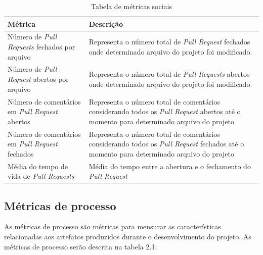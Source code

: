 \begin{table}[]
\centering
\caption{Tabela de métricas sociais}
\label{metricasociais}
\begin{tabular}{|p{3cm}|p{12cm}|}
\hline
Métrica                                          & Descrição                                                                                                                              \\ \hline
Número de \textit{Pull Requests} fechados por arquivo               & Representa o número total de \textit{Pull Request} fechados onde determinado arquivo do projeto foi modificado.                                 \\ \hline
Número de \textit{Pull Request} abertos por arquivo                 & Representa o número total de \textit{Pull Requests} abertos onde determinado arquivo do projeto foi modificado.                                 \\ \hline
Número de comentários em \textit{Pull Request} abertos  & Representa o número total de comentários considerando todos os \textit{Pull Request} abertos até o momento para determinado arquivo do projeto  \\ \hline
Número de comentários em \textit{Pull Request} fechados & Representa o número total de comentários considerando todos os \textit{Pull Request} fechados até o momento para determinado arquivo do projeto \\ \hline
Média do tempo de vida de \textit{Pull Requests}    & Média do tempo entre a abertura e o fechamento do \textit{Pull Request} \\ \hline
\end{tabular}
\end{table}

\subsection{Métricas de processo}
As métricas de processo são métricas para mensurar as características relacionadas aos artefatos produzidos durante o desenvolvimento do projeto. As métricas de processo serão descrita na tabela 2.1:

